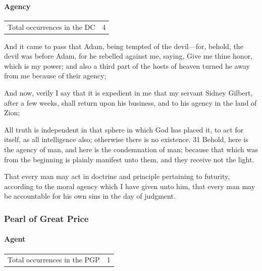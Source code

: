 		\paragraph{Agency}
		
			\begin{tabular}{ll}
				Total occurrences in the DC & 4
			\end{tabular}
		
			\begin{compactdesc}
				\item[{\hyperref[DC29-36]{DC 29:36}}] And it came to pass that Adam, being tempted of the devil---for, behold, the devil was before Adam, for he rebelled against me, saying, Give me thine honor, which is my power; and also a third part of the hosts of heaven turned he away from me because of their agency;
				\item[{\hyperref[DC64-18]{DC 64:18}}] And now, verily I say that it is expedient in me that my servant Sidney Gilbert, after a few weeks, shall return upon his business, and to his agency in the land of Zion;
				\item[{\hyperref[DC93-31]{DC 93:31}}] All truth is independent in that sphere in which God has placed it, to act for itself, as all intelligence also; otherwise there is no existence. 31 Behold, here is the agency of man, and here is the condemnation of man; because that which was from the beginning is plainly manifest unto them, and they receive not the light.
				\item[{\hyperref[DC101-78]{DC 101:78}}] That every man may act in doctrine and principle pertaining to futurity, according to the moral agency which I have given unto him, that every man may be accountable for his own sins in the day of judgment.
			\end{compactdesc}
		
	\subsubsection{Pearl of Great Price} %
		\label{AGENCY-PGP}
	
		\paragraph{Agent}
	
			\begin{tabular}{ll}
				Total occurrences in the PGP & 1
			\end{tabular}
			
